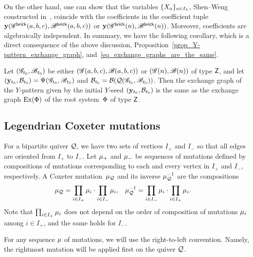 On the other hand, one can show that the variables $\{X_a\}_{a\in I_\lambda}$, Shen--Weng constructed in~\cite[\S 3.2]{SW2019}, coincide with the coefficients in the coefficient tuple $\mathbf{y}(\mathscr{G}^{\mathsf{brick}}(a,b,c),\mathscr{B}^{\mathsf{brick}}(a,b,c))$ or $\mathbf{y}(\mathscr{G}^{\mathsf{brick}}(n),\mathscr{B}^{\mathsf{brick}}(n))$. Moreover, coefficients are algebraically independent.
In summary, we have the following corollary, which is a direct consequence of the above discussion, Proposition~\ref{prop_Y-pattern_exchange_graph}, and~\eqref{eq_exchange_graphs_are_the_same}.
\begin{corollary}\label{corollary:algebraic independence}
Let $(\mathscr{G}_{t_0},\mathscr{B}_{t_0})$ be either $(\mathscr{G}(a,b,c), \mathscr{B}(a,b,c))$ or $(\mathscr{G}(n), \mathscr{B}(n))$ of type $\mathsf{Z}$, and let $(\mathbf{y}_{t_0},\mathcal{B}_{t_0})=\Psi(\mathscr{G}_{t_0}, \mathscr{B}_{t_0})$ and $\mathcal{B}_{t_0}=\mathcal{B}(\mathcal{Q}(\mathscr{G}_{t_0},\mathscr{B}_{t_0}))$.
Then the exchange graph of the $Y$-pattern given by the initial $Y$-seed $(\mathbf{y}_{t_0},\mathcal{B}_{t_0})$ is the same as the exchange graph $\operatorname{Ex}(\Phi)$ of the root system~$\Phi$ of type $\mathsf{Z}$.
\end{corollary}


\subsection{Legendrian Coxeter mutations}

For a bipartite quiver $\mathcal{Q}$, we have two sets of vertices $I_+$ and
$I_-$ so that all edges are oriented from $I_+$ to $I_-$.
Let $\mu_+$ and $\mu_-$ be sequences of mutations defined by 
compositions of mutations corresponding to each and every vertex in $I_+$ and 
$I_-$, respectively.
A Coxeter mutation~$\mu_{\mathcal{Q}}$ and its inverse $\mu_{\mathcal{Q}}^{-1}$ are the compositions
\begin{align*}
\mu_\mathcal{Q}&=\prod_{i\in I_+}\mu_i \cdot \prod_{i\in I_-} \mu_i,&
\mu_\mathcal{Q}^{-1}&=\prod_{i\in I_-}\mu_i \cdot \prod_{i\in I_+} \mu_i.
\end{align*}
Note that $\prod_{i\in I_+}\mu_i$ does not depend on the order of composition of mutations $\mu_i$ among $i\in I_+$, and the same holds for $I_-$.

\begin{remark}\label{rmk_mutation_convention}
For any sequence $\mu$ of mutations, we will use the right-to-left convention. Namely, the rightmost mutation will be applied first on the quiver $\mathcal{Q}$.
\end{remark}

